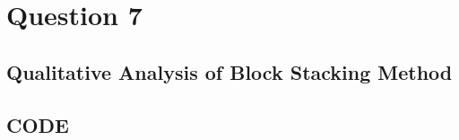 \section{Question 7}
	\subsection{Qualitative Analysis of Block Stacking Method}
	\subsection{CODE}
%	
